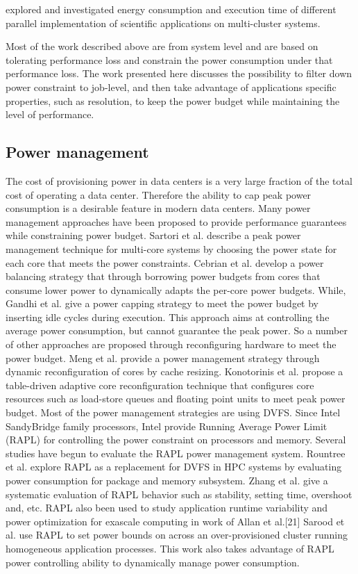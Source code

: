 \documentclass[10pt, conference, compsocconf]{IEEEtran}
\begin{document}
explored and investigated energy consumption and execution time of different parallel implementation of scientific applications on multi-cluster systems. 

Most of the work described above are from system level and are based on tolerating performance loss and constrain the power consumption under that performance loss. The work presented here discusses the possibility to filter down power constraint to job-level, and then take advantage of applications specific properties, such as resolution, to keep the power budget while maintaining the level of performance. 

\subsection{Power management}
The cost of provisioning power in data centers is a very large fraction of the total cost of operating a data center.\cite{pelley2010power,hamilton2008cost} Therefore the ability to cap peak power consumption is a desirable feature in modern data centers.\cite{cochran2011pack} Many power management approaches have been proposed to provide performance guarantees while constraining power budget. Sartori et al.\cite{sartori2009distributed} describe a peak power management technique for multi-core systems by choosing the power state for each core that meets the power constraints. Cebrian et al.\cite{cebrian2011power} develop a power balancing strategy that through borrowing power budgets from cores that consume lower power to dynamically adapts the per-core power budgets. While, Gandhi et al.\cite{gandhi2009power} give a power capping strategy to meet the power budget by inserting idle cycles during execution. This approach aims at controlling the average power consumption, but cannot guarantee the peak power. So a number of other approaches are proposed through reconfiguring hardware to meet the power budget. Meng et al.\cite{meng2008multi} provide a power management strategy through dynamic reconfiguration of cores by cache resizing. Konotorinis et al.\cite{kontorinis2009reducing} propose a table-driven adaptive core reconfiguration technique that configures core resources such as load-store queues and floating point units to meet peak power budget. Most of the power management strategies are using DVFS. Since Intel SandyBridge family processors, Intel provide Running Average Power Limit (RAPL) for controlling the power constraint on processors and memory. Several studies have begun to evaluate the RAPL power management system. Rountree et al.\cite{rountree2012beyond} explore RAPL as a replacement for DVFS in HPC systems by evaluating power consumption for package and memory subsystem. Zhang et al.\cite{zhang2015quantitative} give a systematic evaluation of RAPL behavior such as stability, setting time, overshoot and, etc. RAPL also been used to study application runtime variability and power optimization for exascale computing in work of Allan et al.\cite{porterfield2015application}[21] Sarood et al.\cite{sarood2013optimizing} use RAPL to set power bounds on across an over-provisioned cluster running homogeneous application processes.  This work also takes advantage of RAPL power controlling ability to dynamically manage power consumption.
\end{document}
